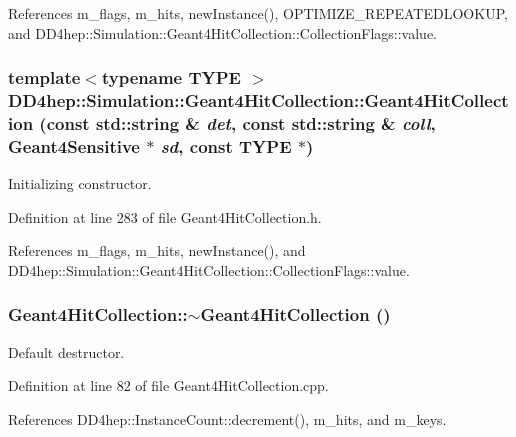 References m\_\-flags, m\_\-hits, newInstance(), OPTIMIZE\_\-REPEATEDLOOKUP, and DD4hep::Simulation::Geant4HitCollection::CollectionFlags::value.\hypertarget{class_d_d4hep_1_1_simulation_1_1_geant4_hit_collection_a747970f0854957004594f49ad45db23f}{
\subsubsection[{Geant4HitCollection}]{\setlength{\rightskip}{0pt plus 5cm}template$<$typename TYPE $>$ DD4hep::Simulation::Geant4HitCollection::Geant4HitCollection (const std::string \& {\em det}, \/  const std::string \& {\em coll}, \/  {\bf Geant4Sensitive} $\ast$ {\em sd}, \/  const TYPE $\ast$)}}
\label{class_d_d4hep_1_1_simulation_1_1_geant4_hit_collection_a747970f0854957004594f49ad45db23f}


Initializing constructor. 

Definition at line 283 of file Geant4HitCollection.h.

References m\_\-flags, m\_\-hits, newInstance(), and DD4hep::Simulation::Geant4HitCollection::CollectionFlags::value.\hypertarget{class_d_d4hep_1_1_simulation_1_1_geant4_hit_collection_a2e586ee3c0a22239858669a4d310e386}{
\subsubsection[{$\sim$Geant4HitCollection}]{\setlength{\rightskip}{0pt plus 5cm}Geant4HitCollection::$\sim$Geant4HitCollection ()}}
\label{class_d_d4hep_1_1_simulation_1_1_geant4_hit_collection_a2e586ee3c0a22239858669a4d310e386}


Default destructor. 

Definition at line 82 of file Geant4HitCollection.cpp.

References DD4hep::InstanceCount::decrement(), m\_\-hits, and m\_\-keys.

